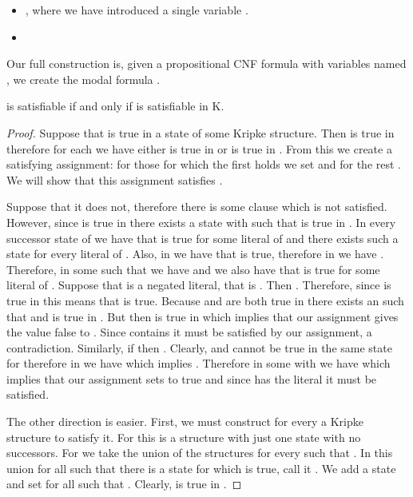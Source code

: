 \documentclass{llncs}
\begin{document}
\begin{itemize}

\item , where
we have introduced a single variable .

\item 

\end{itemize}

Our full construction is, given a propositional CNF formula  with 
variables named , we create the modal formula
. 


\begin{lemma}

 is satisfiable if and only if  is satisfiable in K.

\end{lemma}

\begin{proof}

Suppose that  is true in a state  of some Kripke structure.  Then
 is true in  therefore for each  we have either
 is true in  or
 is true in . From this we
create a satisfying assignment: for those  for which the first holds we set
 and for the rest . We will show that this assignment
satisfies .

Suppose that it does not, therefore there is some clause  which is not
satisfied. However, since  is true in  there exists a state 
with  such that  is true in . In every successor state of 
we have that  is true for some literal  of  and there
exists such a state for every literal of . Also, in  we have that
 is true, therefore in  we have . Therefore, in some  such that  we have 
and we also have that  is true for some literal  of .
Suppose that  is a negated literal, that is . Then
.
Therefore, since  is true in  this means that  is
true. Because  and  are both true in  there
exists an  such that  and  is true in . But then
 is true in  which implies that
our assignment gives the value false to . Since  contains 
it must be satisfied by our assignment, a contradiction. Similarly, if
 then . Clearly,
 and  cannot be true in the same state for  therefore in  we
have  which implies . Therefore in some  with
 we have  which implies that our assignment sets  to true
and since  has the literal  it must be satisfied.

The other direction is easier. First, we must construct for every  a
Kripke structure to satisfy it. For  this is a structure with just one
state with no successors. For  we take the union of the structures for
every  such that . In this union for all  such that 
there is a state for which  is true, call it . We add a state 
and set  for all  such that . Clearly,  is true in
.


\end{proof}
\end{document}
